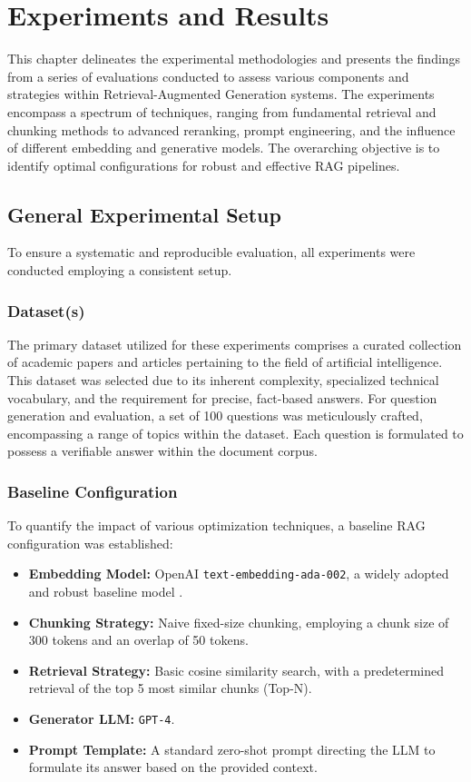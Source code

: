 \chapter{Experiments and Results}
\label{chap:experiments_results}

This chapter delineates the experimental methodologies and presents the findings from a series of evaluations conducted to assess various components and strategies within Retrieval-Augmented Generation systems. The experiments encompass a spectrum of techniques, ranging from fundamental retrieval and chunking methods to advanced reranking, prompt engineering, and the influence of different embedding and generative models. The overarching objective is to identify optimal configurations for robust and effective RAG pipelines.

\section{General Experimental Setup}
\label{sec:general_setup}
To ensure a systematic and reproducible evaluation, all experiments were conducted employing a consistent setup.

\subsection{Dataset(s)}
The primary dataset utilized for these experiments comprises a curated collection of academic papers and articles pertaining to the field of artificial intelligence. This dataset was selected due to its inherent complexity, specialized technical vocabulary, and the requirement for precise, fact-based answers. For question generation and evaluation, a set of 100 questions was meticulously crafted, encompassing a range of topics within the dataset. Each question is formulated to possess a verifiable answer within the document corpus.

\subsection{Baseline Configuration}
To quantify the impact of various optimization techniques, a baseline RAG configuration was established:
\begin{itemize}
    \item \textbf{Embedding Model:} OpenAI \texttt{text-embedding-ada-002}, a widely adopted and robust baseline model \autocite{openai2022ada002}.
    \item \textbf{Chunking Strategy:} Naive fixed-size chunking, employing a chunk size of 300 tokens and an overlap of 50 tokens.
    \item \textbf{Retrieval Strategy:} Basic cosine similarity search, with a predetermined retrieval of the top 5 most similar chunks (Top-N).
    \item \textbf{Generator LLM:} \texttt{GPT-4}.
    \item \textbf{Prompt Template:} A standard zero-shot prompt directing the LLM to formulate its answer based on the provided context.
\end{itemize}

